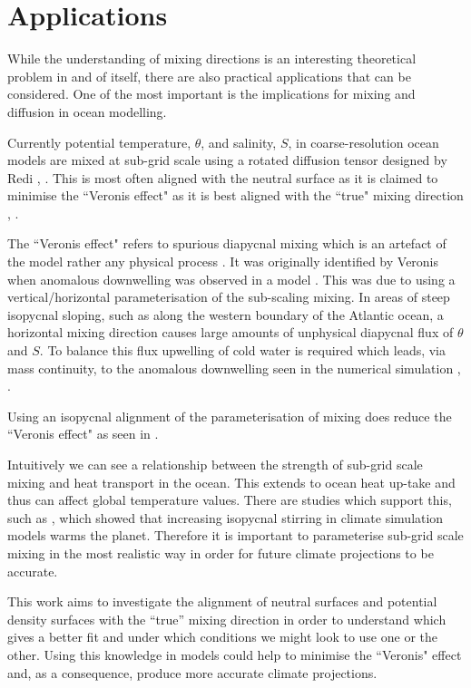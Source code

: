\section{Applications}
\label{section:lit_review_applications}
While the understanding of mixing directions is an interesting theoretical problem in and of itself, there are also practical applications that can be considered. One of the most important is the implications for mixing and diffusion in ocean modelling. 

Currently potential temperature, $\theta$, and salinity, $S$, in coarse-resolution ocean models are mixed at sub-grid scale using a rotated diffusion tensor designed by Redi \citep{Hochet2019}, \citep{Redi1982}. This is most often aligned with the neutral surface as it is claimed to minimise the ``Veronis effect" as it is best aligned with the ``true" mixing direction \citep{McDougall1987}, \citep{McDougall2014}.  

The ``Veronis effect" refers to spurious diapycnal mixing which is an artefact of the model rather any physical process \citet{Tailleux2016}. It was originally identified by Veronis when anomalous downwelling was observed in a model \citet{Veronis1975}. This was due to using a vertical/horizontal parameterisation of the sub-scaling mixing. In areas of steep isopycnal sloping, such as along the western boundary of the Atlantic ocean, a horizontal mixing direction causes large amounts of unphysical diapycnal flux of $\theta$ and $S$. To balance this flux upwelling of cold water is required which leads, via mass continuity, to the anomalous downwelling seen in the numerical simulation \citep{Gough1995}, \citep{Veronis1975}. 

Using an isopycnal alignment of the parameterisation of mixing does reduce the ``Veronis effect" as seen in \citet{Gough1995}.  

Intuitively we can see a relationship between the strength of sub-grid scale mixing and heat transport in the ocean. This extends to ocean heat up-take and thus can affect global temperature values. There are studies which support this, such as \citet{Pradal2104}, which showed that increasing isopycnal stirring in climate simulation models warms the planet. Therefore it is important to parameterise sub-grid scale mixing in the most realistic way in order for future climate projections to be accurate. 

This work aims to investigate the alignment of neutral surfaces and potential density surfaces with the ``true'' mixing direction in order to understand which gives a better fit and under which conditions we might look to use one or the other. Using this knowledge in models could help to minimise the ``Veronis" effect and, as a consequence, produce more accurate climate projections.